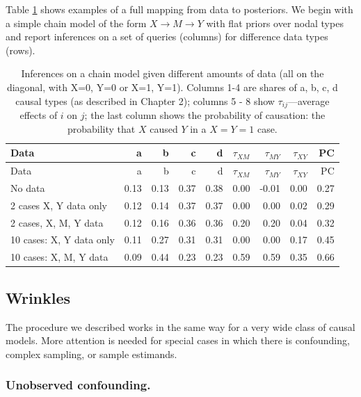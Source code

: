 \documentclass[
  12pt,
]{book}
\begin{document}
Table \ref{tab:chainillustration} shows examples of a full mapping from data to posteriors. We begin with a simple chain model of the form \(X\rightarrow M \rightarrow Y\) with flat priors over nodal types and report inferences on a set of queries (columns) for difference data types (rows).

\begin{longtable}[]{@{}lrrrrrrrr@{}}
\caption{\label{tab:chainillustration}Inferences on a chain model given different amounts of data (all on the diagonal, with X=0, Y=0 or X=1, Y=1). Columns 1-4 are shares of a, b, c, d causal types (as described in Chapter 2); columns 5 - 8 show \(\tau_{ij}\)---average effects of \(i\) on \(j\); the last column shows the probability of causation: the probability that \(X\) caused \(Y\) in a \(X=Y=1\) case.}\tabularnewline
\toprule
Data & a & b & c & d & \(\tau_{XM}\) & \(\tau_{MY}\) & \(\tau_{XY}\) & PC \\
\midrule
\endfirsthead
\toprule
Data & a & b & c & d & \(\tau_{XM}\) & \(\tau_{MY}\) & \(\tau_{XY}\) & PC \\
\midrule
\endhead
No data & 0.13 & 0.13 & 0.37 & 0.38 & 0.00 & -0.01 & 0.00 & 0.27 \\
2 cases X, Y data only & 0.12 & 0.14 & 0.37 & 0.37 & 0.00 & 0.00 & 0.02 & 0.29 \\
2 cases, X, M, Y data & 0.12 & 0.16 & 0.36 & 0.36 & 0.20 & 0.20 & 0.04 & 0.32 \\
10 cases: X, Y data only & 0.11 & 0.27 & 0.31 & 0.31 & 0.00 & 0.00 & 0.17 & 0.45 \\
10 cases: X, M, Y data & 0.09 & 0.44 & 0.23 & 0.23 & 0.59 & 0.59 & 0.35 & 0.66 \\
\bottomrule
\end{longtable}

\hypertarget{wrinkles}{%
\subsection{Wrinkles}\label{wrinkles}}

The procedure we described works in the same way for a very wide class of causal models. More attention is needed for special cases in which there is confounding, complex sampling, or sample estimands.

\hypertarget{unobserved-confounding.}{%
\subsubsection{Unobserved confounding.}\label{unobserved-confounding.}}
\end{document}
